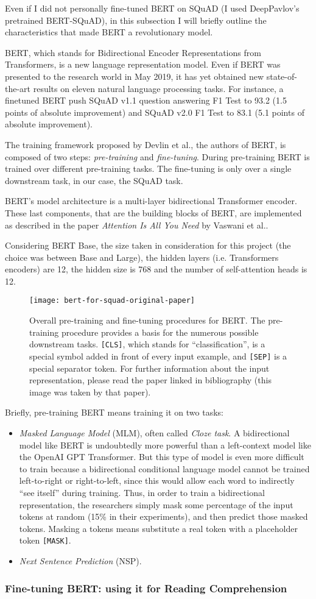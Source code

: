Even if I did not personally fine-tuned BERT on SQuAD (I used DeepPavlov's pretrained BERT-SQuAD), in this subsection I will briefly outline the characteristics that made BERT a revolutionary model.

BERT, which stands for Bidirectional Encoder Representations from Transformers, is a new language representation model. Even if BERT was presented to the research world in May 2019, it has yet obtained new state-of-the-art results on eleven natural language processing tasks. For instance, a finetuned BERT push SQuAD v1.1 question answering F1 Test to 93.2 (1.5 points of absolute improvement) and SQuAD v2.0 F1 Test to 83.1 (5.1 points of absolute improvement).

The training framework proposed by Devlin et al., the authors of BERT, is composed of two steps: \textit{pre-training} and \textit{fine-tuning}. During pre-training BERT is trained over different pre-training tasks. The fine-tuning is only over a single downstream task, in our case, the SQuAD task.

BERT’s  model  architecture is a multi-layer bidirectional Transformer encoder. These last components, that are the building blocks of BERT, are implemented as described in the paper \textit{Attention Is All You Need} by Vaswani et al..

Considering BERT Base, the size taken in consideration for this project (the choice was between Base and Large), the hidden layers (i.e. Transformers encoders) are 12, the hidden size is 768 and the number of self-attention heads is 12.

\begin{figure}[t]
\centering
\texttt{[image: bert-for-squad-original-paper]}
\caption{Overall pre-training and fine-tuning procedures for BERT. The pre-training procedure provides a basis for the numerous possible downstream tasks. \texttt{[CLS]}, which stands for ``classification'', is a special symbol added in front of every input example, and \texttt{[SEP]} is a special separator token. For further information about the input representation, please read the paper linked in bibliography (this image was taken by that paper).}
\medskip
\end{figure}

Briefly, pre-training BERT means training it on two tasks:
\begin{itemize}
  \item \textit{Masked Language Model} (MLM), often called \textit{Cloze task}. A bidirectional model like BERT is undoubtedly more powerful than a left-context model like the OpenAI GPT Transformer. But this type of model is even more difficult to train because a bidirectional conditional language model cannot be trained left-to-right or right-to-left, since this would allow each word to indirectly “see itself” during training. Thus, in order to train a bidirectional representation, the researchers simply mask some percentage of the input tokens at random (15\% in their experiments), and then predict those masked tokens. Masking a tokens means substitute a real token with a placeholder token \texttt{[MASK]}. 
  \item \textit{Next Sentence Prediction} (NSP). 
\end{itemize}

\subsubsection{Fine-tuning BERT: using it for Reading Comprehension}